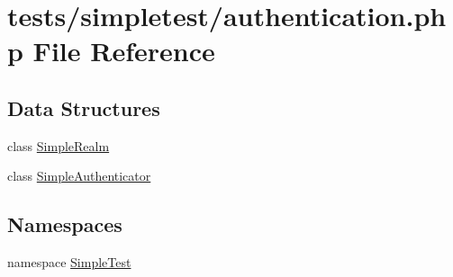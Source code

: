 \hypertarget{authentication_8php}{\section{tests/simpletest/authentication.php File Reference}
\label{authentication_8php}
}
\subsection*{Data Structures}
\begin{DoxyCompactItemize}
\item 
class \hyperlink{class_simple_realm}{Simple\-Realm}
\item 
class \hyperlink{class_simple_authenticator}{Simple\-Authenticator}
\end{DoxyCompactItemize}
\subsection*{Namespaces}
\begin{DoxyCompactItemize}
\item 
namespace \hyperlink{namespace_simple_test}{Simple\-Test}
\end{DoxyCompactItemize}
